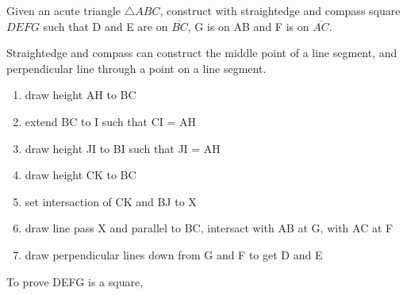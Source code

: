 \documentclass[10pt]{article}
\begin{document}
	\pagestyle{cheader}
	
	\begin{problem}{}{}
		Given an acute triangle $\triangle ABC$, construct with straightedge and compass square $DEFG$ 
		such that D and E are on $\overline{BC}$, G is on AB and F is on $\overline{AC}$.
	\end{problem}

	\noindent
	Straightedge and compass can construct the middle point of a line segment, and perpendicular line 
	through a point on a line segment.
	\begin{enumerate}
		\item draw height AH to BC
		\item extend BC to I such that CI = AH
		\item draw height JI to BI such that JI = AH
		\item draw height CK to BC
		\item set intersaction of CK and BJ to X
		\item draw line pass X and parallel to BC, intersact with AB at G, with AC at F
		\item draw perpendicular lines down from G and F to get D and E		
	\end{enumerate}
	To prove DEFG is a square, 
\end{document}
